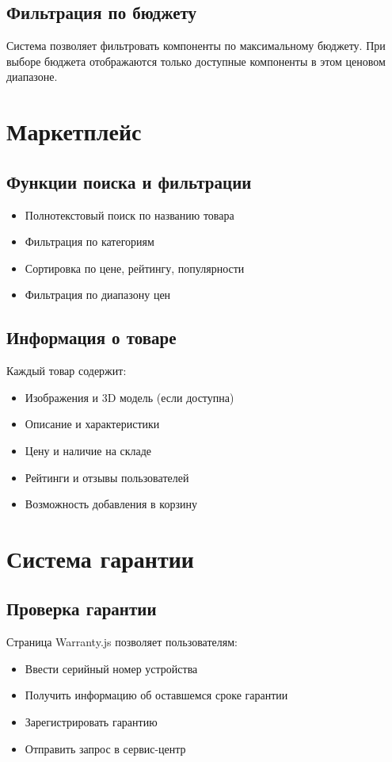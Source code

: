 \documentclass[12pt,a4paper]{report}
\begin{document}
\subsection{Фильтрация по бюджету}
Система позволяет фильтровать компоненты по максимальному бюджету. При выборе бюджета отображаются только доступные компоненты в этом ценовом диапазоне.

\section{Маркетплейс}

\subsection{Функции поиска и фильтрации}
\begin{itemize}
    \item Полнотекстовый поиск по названию товара
    \item Фильтрация по категориям
    \item Сортировка по цене, рейтингу, популярности
    \item Фильтрация по диапазону цен
\end{itemize}

\subsection{Информация о товаре}
Каждый товар содержит:
\begin{itemize}
    \item Изображения и 3D модель (если доступна)
    \item Описание и характеристики
    \item Цену и наличие на складе
    \item Рейтинги и отзывы пользователей
    \item Возможность добавления в корзину
\end{itemize}

\section{Система гарантии}

\subsection{Проверка гарантии}
Страница Warranty.js позволяет пользователям:
\begin{itemize}
    \item Ввести серийный номер устройства
    \item Получить информацию об оставшемся сроке гарантии
    \item Зарегистрировать гарантию
    \item Отправить запрос в сервис-центр
\end{itemize}
\end{document}
